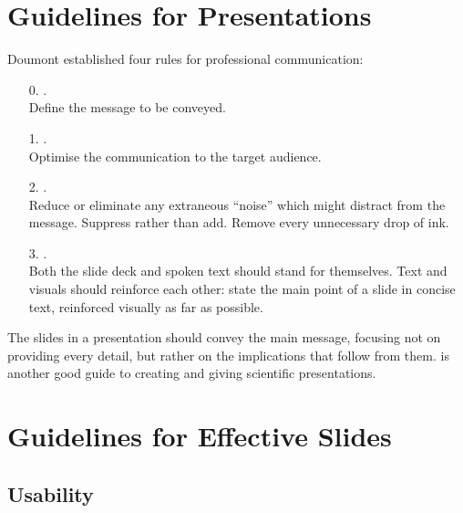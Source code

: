 \section{Guidelines for Presentations}

Doumont \parencite{ThreeLaws,cognitivestyle,Doumont-TreesMapsTheorems}
established four rules for professional communication:
\begin{enumerate}
\item[0.] . \\
  Define the message to be conveyed.

\item[1.] . \\
  Optimise the communication to the target audience.

\item[2.] . \\
  Reduce or eliminate any extraneous ``noise'' which might
  distract from the message. Suppress rather than add.
  Remove every unnecessary drop of ink.

\item[3.] . \\
  Both the slide deck and spoken text should stand for themselves.  
  Text and visuals should reinforce each other: state the main
  point of a slide in concise text, reinforced visually
  as far as possible.
\end{enumerate}
The slides in a presentation should convey the main message, focusing
not on providing every detail, but rather on the implications that
follow from them. \textcite{Alley-CraftScientificPresentations-2Ed} is
another good guide to creating and giving scientific presentations.





\section{Guidelines for Effective Slides}


\subsection{Usability}

